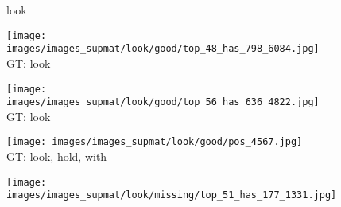 \documentclass[10pt,twocolumn,letterpaper]{article}
\begin{document}
\begin{figure*}[t]
	\begin{minipage}[t]{0.005\textwidth}
    	\centering
    	\vspace{-8.5ex}
    	\begin{turn}{90}
    	look
    	\end{turn}
    	\vspace{3ex}
   	\end{minipage}
    \hspace{0.01\textwidth}
    \begin{minipage}[t]{0.18\textwidth}
    	\centering
       	\texttt{[image: images/images\_supmat/look/good/top\_48\_has\_798\_6084.jpg]}\\
       	\vspace{0.3ex}
       	GT: look
       	\vspace{0.2ex}
    \end{minipage}  
    \hspace{0.005\textwidth}
    \begin{minipage}[t]{0.18\textwidth}
    	\centering
       	\texttt{[image: images/images\_supmat/look/good/top\_56\_has\_636\_4822.jpg]}\\
       	\vspace{0.3ex}
       	GT: look
       	\vspace{0.2ex}
    \end{minipage} 
    \hspace{0.005\textwidth}
    \begin{minipage}[t]{0.18\textwidth}
    	\centering
       	\texttt{[image: images/images\_supmat/look/good/pos\_4567.jpg]}\\
       	\vspace{0.3ex}
       	GT: look, hold, with
       	\vspace{0.2ex}
    \end{minipage}
    \hspace{0.005\textwidth}
    \begin{minipage}[t]{0.18\textwidth}
       	\centering
    	\texttt{[image: images/images\_supmat/look/missing/top\_51\_has\_177\_1331.jpg]}\\

\end{minipage}
\end{figure*}
\end{document}
